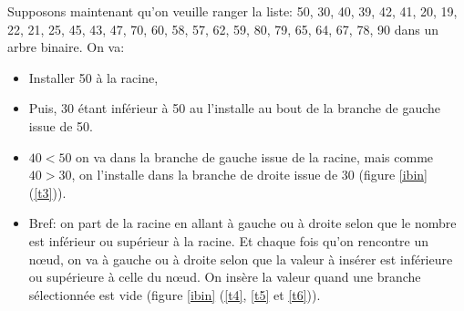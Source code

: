 Supposons maintenant qu'on veuille ranger la liste:  50, 30, 40, 39,
42, 41, 20, 19, 22, 21, 25, 45, 43, 47, 70, 60, 58, 57, 62, 59, 80,
79, 65, 64, 67, 78, 90 dans un arbre binaire. On va:

\begin{itemize}
\item Installer 50 à la racine,
\item Puis, 30 étant inférieur à 50 au l'installe au bout de la branche
de gauche issue de 50.
\item $40 < 50$ on va dans la branche de gauche issue de la racine,
  mais comme $40>30$, on l'installe dans la branche de droite issue de
  $30$ (figure \ref{ibin} (\ref{t3})).
\item Bref: on part de la racine en allant à gauche ou à droite selon
  que le nombre est inférieur ou supérieur à la racine. Et chaque fois
  qu'on rencontre un n{\oe}ud, on va à gauche ou à droite selon que la
  valeur à insérer est inférieure ou supérieure à celle du
  n{\oe}ud. On insère la valeur quand une branche sélectionnée est vide
  (figure \ref{ibin} (\ref{t4}, \ref{t5} et \ref{t6})).
\end{itemize}
